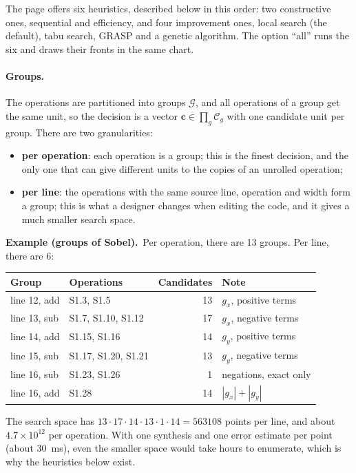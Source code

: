 \documentclass[11pt,a4paper]{article}
\newcommand{\examplebox}[2]{\par\medskip\noindent\colorbox{tabAzul!6}{\begin{minipage}{\dimexpr\linewidth-2\fboxsep}
  \textbf{Example (#1).}\ #2\end{minipage}}\par\medskip}
\begin{document}
The page offers six heuristics, described below in this order: two constructive ones, sequential and efficiency, and
four improvement ones, local search (the default), tabu search, GRASP and a genetic algorithm. The option ``all''
runs the six and draws their fronts in the same chart.

\paragraph{Groups.} The operations are partitioned into groups $\mathcal{G}$, and all operations of a group get the
same unit, so the decision is a vector $\mathbf{c} \in \prod_{g} \mathcal{C}_g$ with one candidate unit per group.
There are two granularities:
\begin{itemize}
  \item \textbf{per operation}: each operation is a group; this is the finest decision, and the only one that can
    give different units to the copies of an unrolled operation;
  \item \textbf{per line}: the operations with the same source line, operation and width form a group; this is what a
    designer changes when editing the code, and it gives a much smaller search space.
\end{itemize}

\examplebox{groups of Sobel}{Per operation, there are 13 groups. Per line, there are 6:
\begin{center}
\rowcolors{2}{gray!10}{white}
\begin{tabular}{|l|l|r|l|}
\hline
\rowcolor{tabAzul}\color{white} Group & \color{white} Operations & \color{white} Candidates & \color{white} Note \\
\hline
line 12, add & S1.3, S1.5 & 13 & $g_x$, positive terms \\
line 13, sub & S1.7, S1.10, S1.12 & 17 & $g_x$, negative terms \\
line 14, add & S1.15, S1.16 & 14 & $g_y$, positive terms \\
line 15, sub & S1.17, S1.20, S1.21 & 13 & $g_y$, negative terms \\
line 16, sub & S1.23, S1.26 & 1 & negations, exact only \\
line 16, add & S1.28 & 14 & $|g_x| + |g_y|$ \\
\hline
\end{tabular}
\end{center}
The search space has $13 \cdot 17 \cdot 14 \cdot 13 \cdot 1 \cdot 14 = 563108$ points per line, and about
$4.7 \times 10^{12}$ per operation. With one synthesis and one error estimate per point (about 30~ms), even the
smaller space would take hours to enumerate, which is why the heuristics below exist.}
\end{document}
